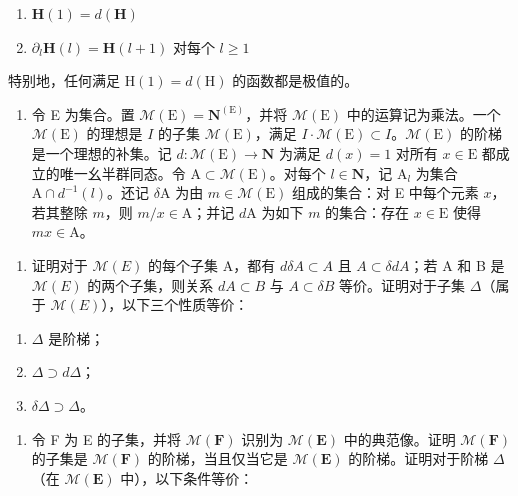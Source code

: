 \begin{enumerate}
\def\labelenumi{(\roman{enumi})}
\setcounter{enumi}{1}
\item
  \(\mathbf{H}(1) = d(\mathbf{H})\)
\item
  \(\partial_{l}\mathbf{H}(l) = \mathbf{H}(l + 1)\) 对每个 \(l\geqslant 1\)
\end{enumerate}

特别地，任何满足 \(\mathrm{H}(1)=d(\mathrm{H})\) 的函数都是极值的。

\begin{enumerate}
\def\labelenumi{\arabic{enumi})}
\setcounter{enumi}{7}
\tightlist
\item
  令 E 为集合。置 \(\mathcal{M}(\mathrm{E}) = \mathbf{N}^{(\mathrm{E})}\)，并将 \(\mathcal{M}(\mathrm{E})\) 中的运算记为乘法。一个 \(\mathcal{M}(\mathrm{E})\) 的理想是 \(I\) 的子集 \(\mathcal{M}(\mathrm{E})\)，满足 \(I\cdot\mathcal{M}(\mathrm{E}) \subset I\)。\(\mathcal{M}(\mathrm{E})\) 的阶梯是一个理想的补集。记 \(d: \mathcal{M}(\mathrm{E}) \to \mathbf{N}\) 为满足 \(d(x) = 1\) 对所有 \(x \in \mathrm{E}\) 都成立的唯一幺半群同态。令 \(\mathrm{A} \subset \mathcal{M}(\mathrm{E})\)。对每个 \(l \in \mathbf{N}\)，记 \(\mathrm{A}_l\) 为集合 \(\mathrm{A} \cap d^{-1}(l)\)。还记 \(\delta \mathrm{A}\) 为由 \(m \in \mathcal{M}(\mathrm{E})\) 组成的集合：对 E 中每个元素 \(x\)，若其整除 \(m\)，则 \(m / x \in \mathrm{A}\)；并记 \(d\mathrm{A}\) 为如下 \(m\) 的集合：存在 \(x \in \mathrm{E}\) 使得 \(mx \in \mathrm{A}\)。
\end{enumerate}

\begin{enumerate}
\def\labelenumi{\alph{enumi})}
\tightlist
\item
  证明对于 \(\mathcal{M}(E)\) 的每个子集 A，都有 \(d\delta A \subset A\) 且 \(A \subset \delta dA\)；若 A 和 B 是 \(\mathcal{M}(E)\) 的两个子集，则关系 \(dA \subset B\) 与 \(A \subset \delta B\) 等价。证明对于子集 \(\Delta\)（属于 \(\mathcal{M}(E)\)），以下三个性质等价：
\end{enumerate}

\begin{enumerate}
\def\labelenumi{(\roman{enumi})}
\item
  \(\Delta\) 是阶梯；
\item
  \(\Delta \supset d\Delta\)；
\item
  \(\delta \Delta \supset \Delta\)。
\end{enumerate}

\begin{enumerate}
\def\labelenumi{\alph{enumi})}
\setcounter{enumi}{1}
\tightlist
\item
  令 F 为 E 的子集，并将 \(\mathcal{M}(\mathbf{F})\) 识别为 \(\mathcal{M}(\mathbf{E})\) 中的典范像。证明 \(\mathcal{M}(\mathbf{F})\) 的子集是 \(\mathcal{M}(\mathbf{F})\) 的阶梯，当且仅当它是 \(\mathcal{M}(\mathbf{E})\) 的阶梯。证明对于阶梯 \(\Delta\)（在 \(\mathcal{M}(\mathbf{E})\) 中），以下条件等价：
\end{enumerate}

